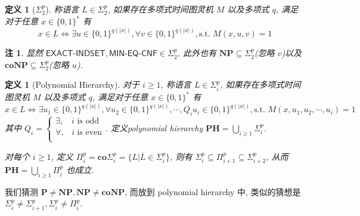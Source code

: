 \documentclass[8pt]{article}
\theoremstyle{compact}
\newtheorem{definition}[theorem]{定义}
\newtheorem{remark}[theorem]{注}
\def\ge{\geqslant}
\def\P{\textbf{P}}
\def\NP{\textbf{NP}}
\def\coNP{\textbf{coNP}}
\def\PH{\textbf{PH}}
\begin{document}
\begin{definition}[$\Sigma_2^p$]
	称语言 $L \in \Sigma_2^p$, 如果存在多项式时间图灵机 $M$ 以及多项式 $q$, 满足对于任意 $x \in \{0, 1\}^*$ 有 $$x \in L \Leftrightarrow \exists u \in \{0, 1\}^{q(|x|)}, \forall v \in \{0, 1\}^{q(|x|)}, \text{s.t. } M(x, u, v) = 1$$
\end{definition}
\begin{remark}
	显然 $\textsf{EXACT-INDSET}, \textsf{MIN-EQ-CNF} \in \Sigma_2^p$, 此外也有 $\NP \subseteq \Sigma_2^p$(忽略 $v$)以及 $\coNP \subseteq \Sigma_2^p$(忽略 $u$).
\end{remark}
\begin{definition}[Polynomial Hierarchy]
	对于 $i \ge 1$, 称语言 $L \in \Sigma_i^p$, 如果存在多项式时间图灵机 $M$ 以及多项式 $q$, 满足对于任意 $x \in \{0, 1\}^*$ 有 $$x \in L \Leftrightarrow \exists u_1 \in \{0, 1\}^{q(|x|)}, \forall u_2 \in \{0, 1\}^{q(|x|)}, \cdots, Q_i u_i \in \{0, 1\}^{q(|x|)}, \text{s.t. } M(x, u_1, u_2, \cdots, u_i) = 1$$
	其中 $Q_i = \begin{cases}
		\exists, & i \text{ is odd}\\
		\forall, & i \text{ is even}\\
	\end{cases}$. 定义polynomial hierarchy $\PH = \bigcup_{i \ge 1} \Sigma_i^p$.

	对每个 $i \ge 1$, 定义 $\Pi_i^p = \textbf{co}\Sigma_i^p = \{L | \overline{L} \in \Sigma_i^p\}$, 则有 $\Sigma_i^p \subseteq \Pi_{i+1}^p \subseteq \Sigma_{i+2}^p$, 从而 $\PH = \bigcup_{i \ge 1}\Pi_i^p$ 也成立.
\end{definition}

我们猜测 $\P \neq \NP, \NP \neq \coNP$, 而放到 polynomial hierarchy 中, 类似的猜想是 $\Sigma_i^p \neq \Sigma_{i+1}^p, \Sigma_i^p \neq \Pi_i^p$.
\end{document}
